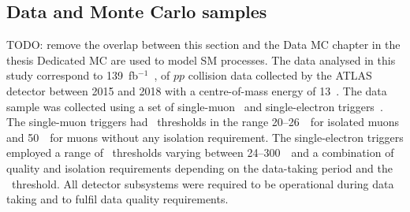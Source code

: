 \documentclass[letterpaper,12pt]{article}
\begin{document}







\subsection{Data and Monte Carlo samples}

\label{sec:samples}
TODO: remove the overlap between this section and the Data MC chapter in the thesis
Dedicated MC are used to model SM processes. 
The data analysed in this study correspond to 139~fb$^{-1}$~\cite{DAPR-2010-01,DAPR-2011-01,DAPR-2013-01,LUCID2}, 
of \(pp\) collision data collected by the ATLAS detector between 2015 and 2018
with a centre-of-mass energy of 13~\TeV. 
The data sample was collected using a set of single-muon~\cite{Aad:2020uyd} 
and single-electron triggers~\cite{TRIG-2018-05}. The single-muon triggers 
had \pt\ thresholds in the range 20--26~\GeV\ for 
isolated muons and 50~\GeV\ for muons without any isolation requirement. 
The single-electron triggers employed a range of \pt\ thresholds 
varying between 24--300~\GeV\ 
and a combination of quality and isolation requirements depending on the 
data-taking period and the \pt\ threshold.
All detector subsystems were required to be operational
during data taking and to fulfil data quality requirements.  
\end{document}
